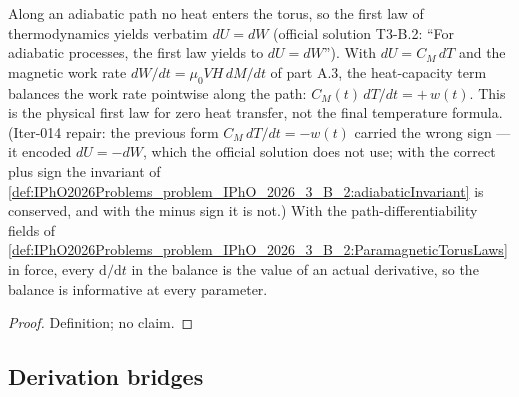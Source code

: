 \begin{definition}
\label{def:IPhO2026Problems_problem_IPhO_2026_3_B_2:IsAdiabaticPath}
Along an adiabatic path no heat enters the torus, so the first law
of thermodynamics yields verbatim $dU = dW$ (official solution T3-B.2:
``For adiabatic processes, the first law yields to $dU = dW$'').  With
$dU = C_M\,dT$ and the magnetic work rate $dW/dt = \mu_0 V H\,dM/dt$ of
part A.3, the heat-capacity term balances the work rate pointwise along
the path: $C_M(t)\,dT/dt = +\,w(t)$.  This is the physical first law
for zero heat transfer, not the final temperature formula.  (Iter-014
repair: the previous form $C_M\,dT/dt = -w(t)$ carried the wrong sign ---
it encoded $dU = -dW$, which the official solution does not use; with the
correct plus sign the invariant of
\cref{def:IPhO2026Problems_problem_IPhO_2026_3_B_2:adiabaticInvariant}
is conserved, and with the minus sign it is not.)
With the path-differentiability fields of
\cref{def:IPhO2026Problems_problem_IPhO_2026_3_B_2:ParamagneticTorusLaws}
in force, every $\mathrm{d}/\mathrm{d}t$ in the balance is the value of an
actual derivative, so the balance is informative at every parameter.
\end{definition}
\begin{proof}
Definition; no claim.
\end{proof}

\subsection*{Derivation bridges}

